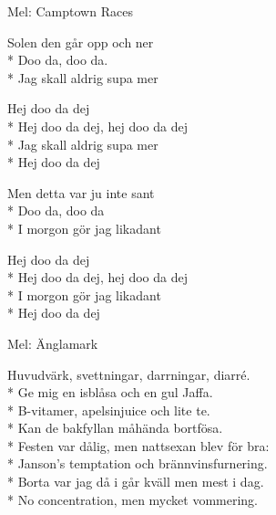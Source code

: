 \begin{SongText}[Solen]
\begin{SongInfo}
    Mel: Camptown Races
\end{SongInfo}
\begin{SongVerse}
Solen den går opp och ner\\*%
Doo da, doo da.\\*%
Jag skall aldrig supa mer
\end{SongVerse}
\begin{SongVerse}
Hej doo da dej\\*%
Hej doo da dej, hej doo da dej\\*%
Jag skall aldrig supa mer\\*%
Hej doo da dej
\end{SongVerse}
\begin{SongVerse}
Men detta var ju inte sant\\*%
Doo da, doo da\\*%
I morgon gör jag likadant
\end{SongVerse}
\begin{SongVerse}
Hej doo da dej\\*%
Hej doo da dej, hej doo da dej\\*%
I morgon gör jag likadant\\*%
Hej doo da dej 
\end{SongVerse}
\end{SongText}
\begin{SongText}[Bakfyllesång]
\begin{SongInfo}
    Mel: Änglamark
\end{SongInfo}
\begin{SongVerse}
Huvudvärk, svettningar, darrningar, diarré.\\*%
Ge mig en isblåsa och en gul Jaffa.\\*%
B-vitamer, apelsinjuice och lite te.\\*%
Kan de bakfyllan måhända bortfösa.\\*%
Festen var dålig, men nattsexan blev för bra:\\*%
Janson's temptation och brännvinsfurnering.\\*%
Borta var jag då i går kväll men mest i dag.\\*%
No concentration, men mycket vommering. 
\end{SongVerse}
\end{SongText}
